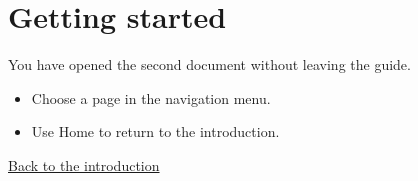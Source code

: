 \usepackage{hyperref}
\section*{Getting started}
You have opened the second document without leaving the guide.
\begin{itemize}
  \item Choose a page in the navigation menu.
  \item Use Home to return to the introduction.
\end{itemize}
\href{cover.tex}{Back to the introduction}
